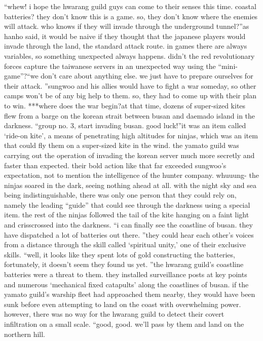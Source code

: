 “whew! i hope the hwarang guild guys can come to their senses this time.
 coastal batteries? they don’t know this is a game.
 so, they don’t know where the enemies will attack.
 who knows if they will invade through the underground tunnel?”as hanho said, it would be naive if they thought that the japanese players would invade through the land, the standard attack route.
in games there are always variables, so something unexpected always happens.
didn’t the red revolutionary forces capture the taiwanese servers in an unexpected way using the “mini-game”?“we don’t care about anything else.
 we just have to prepare ourselves for their attack.
”sungwoo and his allies would have to fight a war someday, so other camps won’t be of any big help to them.
 so, they had to come up with their plan to win.
***where does the war begin?at that time, dozens of super-sized kites flew from a barge on the korean strait between busan and daemado island in the darkness.
“group no.
 3, start invading busan.
 good luck!”it was an item called ‘ride-on kite’, a means of penetrating high altitudes for ninjas, which was an item that could fly them on a super-sized kite in the wind.
the yamato guild was carrying out the operation of invading the korean server much more secretly and faster than expected.
their bold action like that far exceeded sungwoo’s expectation, not to mention the intelligence of the hunter company.
whuuung-
the ninjas soared in the dark, seeing nothing ahead at all.
 with the night sky and sea being indistinguishable, there was only one person that they could rely on, namely the leading “guide” that could see through the darkness using a special item.
the rest of the ninjas followed the tail of the kite hanging on a faint light and crisscrossed into the darkness.
“i can finally see the coastline of busan.
 they have dispatched a lot of batteries out there.
”they could hear each other’s voices from a distance through the skill called ‘spiritual unity,’ one of their exclusive skills.
“well, it looks like they spent lots of gold constructing the batteries, fortunately, it doesn’t seem they found us yet.
”the hwarang guild’s coastline batteries were a threat to them.
they installed surveillance posts at key points and numerous ‘mechanical fixed catapults’ along the coastlines of busan.
if the yamato guild’s warship fleet had approached them nearby, they would have been sunk before even attempting to land on the coast with overwhelming power.
however, there was no way for the hwarang guild to detect their covert infiltration on a small scale.
“good, good.
 we’ll pass by them and land on the northern hill.
